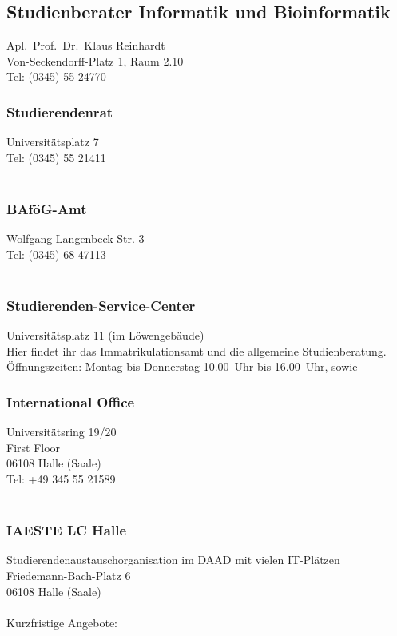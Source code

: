 \subsection{Studienberater Informatik und Bioinformatik}
Apl.\ Prof.\ Dr.\ Klaus Reinhardt\\
Von-Seckendorff-Platz 1, Raum 2.10\\
Tel: (0345) 55 24770\\

\subsubsection{Studierendenrat}
Universitätsplatz 7\\
Tel: (0345) 55 21411\\
 \\

\subsubsection{BAföG-Amt}
Wolfgang-Langenbeck-Str. 3\\
Tel: (0345) 68 47113\\
\\

\subsubsection{Studierenden-Service-Center}
Universitätsplatz 11 (im Löwengebäude)\\
Hier findet ihr das Immatrikulationsamt und die allgemeine
Studienberatung.\\
Öffnungszeiten: Montag bis Donnerstag 10.00~Uhr bis 16.00~Uhr, sowie \\

\subsubsection{International Office}
Universitätsring 19/20 \\
First Floor \\
06108 Halle (Saale) \\
Tel: +49 345 55 21589\\
\\

\subsubsection{IAESTE LC Halle}
Studierendenaustauschorganisation im DAAD mit vielen IT-Plätzen \\
Friedemann-Bach-Platz 6 \\
06108 Halle (Saale) \\
 \\
Kurzfristige Angebote: 

